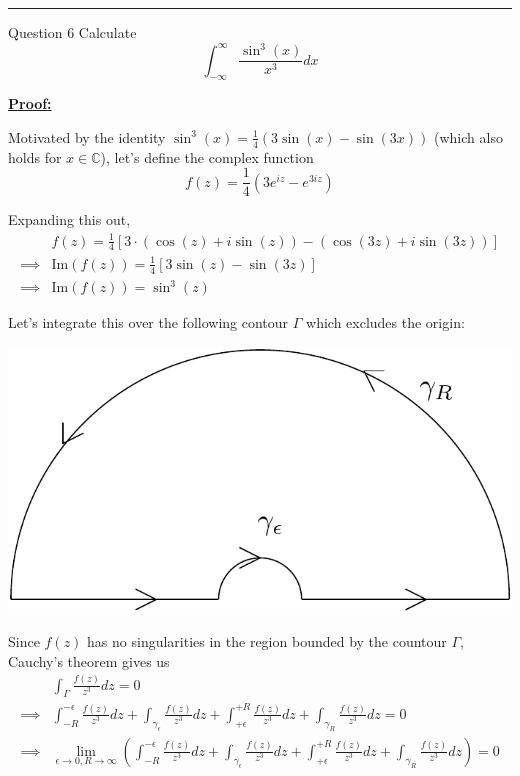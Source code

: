 \documentclass{article}
\newcommand{\C}{\mathbb{C}}
\begin{document}
\vskip 0.5cm
\hrule 
\vskip 0.5cm



\begin{mathdefinitionbox}{Question 6}
\vskip 0.5cm
Calculate 
\[ \int_{-\infty}^{\infty} \frac{\sin^3(x)}{x^3} dx  \]
\end{mathdefinitionbox}

\vskip 0.5cm
\underline{\textbf{Proof:}}


Motivated by the identity $\sin^3(x) = \frac{1}{4}\left( 3\sin(x) - \sin(3x) \right)$ (which also holds for $x \in \C$), let's define the complex function
\[ f(z) = \frac{1}{4} \left( 3e^{iz} - e^{3iz} \right) \]

Expanding this out,
\begin{align*}
  &f(z) = \frac{1}{4} \left[ 3 \cdot \left( \cos(z) + i\sin(z) \right) - \left( \cos(3z) + i\sin(3z) \right) \right] \\
  \implies&\text{Im}(f(z)) = \frac{1}{4} \left[ 3\sin(z) - \sin(3z) \right] \\
  \implies&\text{Im}(f(z)) = \sin^3(z)
\end{align*}

Let's integrate this over the following contour $\Gamma$ which excludes the origin:
\begin{center}
  \includegraphics*[scale=0.40]{Q6 HW 8.png}
\end{center}

\vskip 0.5cm
Since $f(z)$ has no singularities in the region bounded by the countour $\Gamma$, Cauchy's theorem gives us 
\begin{align*}
  &\int_{\Gamma} \frac{f(z)}{z^3} dz = 0 \\
  \implies &\int_{-R}^{-\epsilon} \frac{f(z)}{z^3} dz + \int_{{\gamma_{\epsilon}}} \frac{f(z)}{z^3} dz + \int_{+\epsilon}^{+R} \frac{f(z)}{z^3} dz + \int_{{\gamma_R}} \frac{f(z)}{z^3} dz = 0 \\
  \implies &\lim_{\epsilon \rightarrow 0, R \rightarrow \infty} \left(\int_{-R}^{-\epsilon} \frac{f(z)}{z^3} dz + \int_{{\gamma_{\epsilon}}} \frac{f(z)}{z^3} dz + \int_{+\epsilon}^{+R} \frac{f(z)}{z^3} dz + \int_{{\gamma_R}} \frac{f(z)}{z^3} dz\right) = 0
\end{align*}
\end{document}
